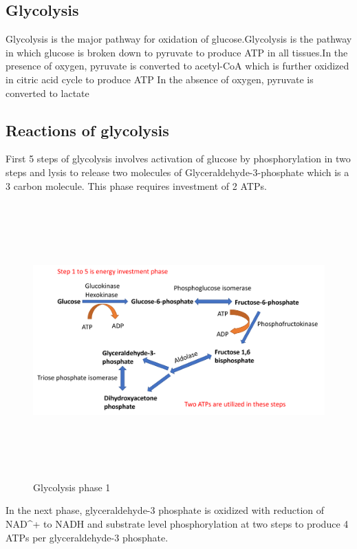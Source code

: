 \documentclass[
]{book}
\begin{document}
\subsection{Glycolysis}\label{glycolysis-1}

Glycolysis is the major pathway for oxidation of glucose.Glycolysis is the pathway in which glucose is broken down to pyruvate to produce ATP in all tissues.In the presence of oxygen, pyruvate is converted to acetyl-CoA which is further oxidized in citric acid cycle to produce ATP In the absence of oxygen, pyruvate is converted to lactate

\subsection{Reactions of glycolysis}\label{reactions-of-glycolysis}

First 5 steps of glycolysis involves activation of glucose by phosphorylation in two steps and lysis to release two molecules of Glyceraldehyde-3-phosphate which is a 3 carbon molecule. This phase requires investment of 2 ATPs.

\begin{figure}
\centering
\includegraphics[width=\textwidth,height=4.16667in]{Images/Gly1.png}
\caption{Glycolysis phase 1}
\end{figure}

In the next phase, glyceraldehyde-3 phosphate is oxidized with reduction of NAD\^{}+ to NADH and substrate level phosphorylation at two steps to produce 4 ATPs per glyceraldehyde-3 phosphate.
\end{document}
